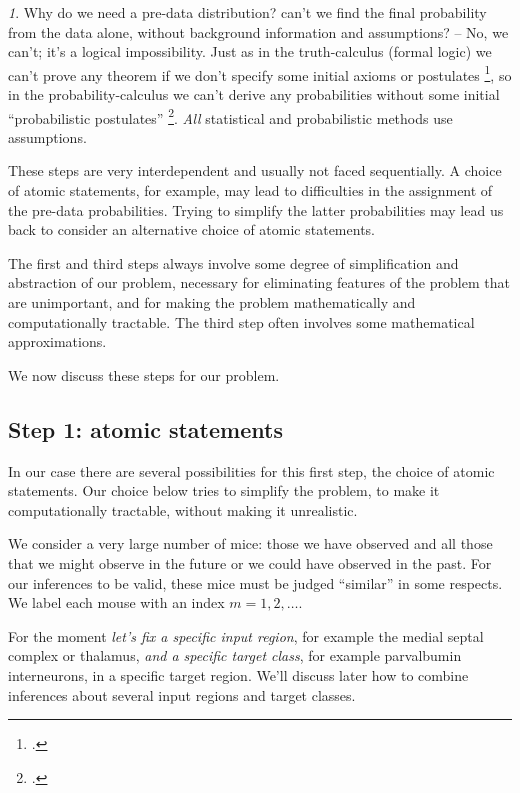 \documentclass[\ifafour a4paper,12pt,\else a5paper,10pt,\fi%
onecolumn,oneside,article,%
british%
]{memoir}
\theoremstyle{remark}
\theoremstyle{innote}
\newtheorem*{innote}{}
\newcommand*{\citep}{\footcites}
\renewcommand*{\|}[1][]{\nonscript\,#1\vert\nonscript\;\mathopen{}}
\newcommand*{\sect}{\S}%
\begin{document}
\begin{innote}
  Why do we need a pre-data distribution? can't we find the final
  probability from the data alone, without background information and
  assumptions? -- No, we can't; it's a logical impossibility. Just as in
  the truth-calculus (formal logic) we can't prove any theorem if we don't
  specify some initial axioms or postulates \citep[\sect~2.1
  p.~43]{barwiseetal1990_r2003}, so in the probability-calculus we can't
  derive any probabilities without some initial \enquote{probabilistic
    postulates} \citep{hailperin2011}[p.~182]{johnson1924}. \emph{All}
  statistical and probabilistic methods use assumptions.
\end{innote}

These steps are very interdependent and usually not faced sequentially. A
choice of atomic statements, for example, may lead to difficulties in the
assignment of the pre-data probabilities. Trying to simplify the latter
probabilities may lead us back to consider an alternative choice of atomic
statements.

The first and third steps always involve some degree of simplification and
abstraction of our problem, necessary for eliminating features of the
problem that are unimportant, and for making the problem mathematically and
computationally tractable. The third step often involves some mathematical
approximations.


\medskip

We now discuss these steps for our problem.


\subsection{Step 1: atomic statements}
\label{sec:step_statements}

In our case there are several possibilities for this first step, the choice
of atomic statements. Our choice below tries to simplify the problem, to
make it computationally tractable, without making it unrealistic.

We consider a very large number of mice: those we have observed and all
those that we might observe in the future or we could have observed in the
past. For our inferences to be valid, these mice must be judged
\enquote{similar} in some respects. We label each mouse with an index
$m=1,2,\dotsc$.

For the moment \emph{let's fix a specific input region}, for example the
medial septal complex or thalamus, \emph{and a specific target class}, for
example parvalbumin interneurons, in a specific target region. We'll
discuss later how to combine inferences about several input regions and target
classes.
\end{document}
